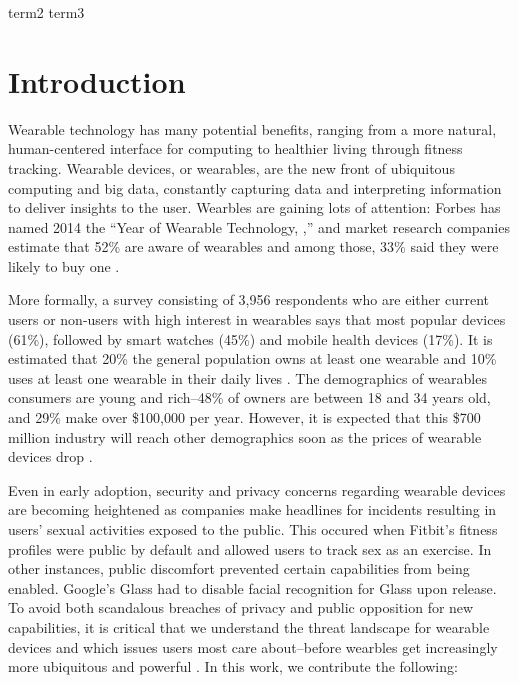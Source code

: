 \documentclass{acm_proc_article-sp}
\begin{document}
 {term2} {term3}



\section{Introduction}
Wearable technology has many potential benefits, ranging from a more natural, human-centered interface for computing to healthier living through fitness tracking. Wearable devices, or wearables, are the new front of ubiquitous computing and big data, constantly capturing data and interpreting information to deliver insights to the user. Wearbles are gaining lots of attention: Forbes has named 2014 the ``Year of Wearable Technology, \cite{Forbes},'' and market research companies estimate that 52\% are aware of wearables and among those, 33\% said they were likely to buy one \cite{NPD}. 

More formally, a survey consisting of 3,956 respondents who are either current users or non-users with high interest in wearables says that most popular devices (61\%), followed by smart watches (45\%) and mobile health devices (17\%)\cite{Nilsen}. It is estimated that 20\% the general population owns at least one wearable and 10\% uses at least one wearable in their daily lives \cite{WearableStatNews}. The demographics of wearables consumers are young and rich--48\% of owners are between 18 and 34 years old, and 29\% make over \$100,000 per year. However, it is expected that this \$700 million industry will reach other demographics soon as the prices of wearable devices drop \cite{cmo}. 



Even in early adoption, security and privacy concerns regarding wearable devices are becoming heightened as companies make headlines for incidents resulting in users' sexual activities exposed to the public. This occured when Fitbit's fitness profiles were public by default and allowed users to track sex as an exercise\cite{Fitbit}. In other instances, public discomfort prevented certain capabilities from being enabled. Google's Glass had to disable facial recognition for Glass \cite{GlassDetection} upon release. To avoid both scandalous breaches of privacy and public opposition for new capabilities, it is critical that we understand the threat landscape for wearable devices and which issues users most care about--before wearbles get increasingly more ubiquitous and powerful \cite{Implants}. In this work, we contribute the following: \\[-0.8cm]
\end{document}

